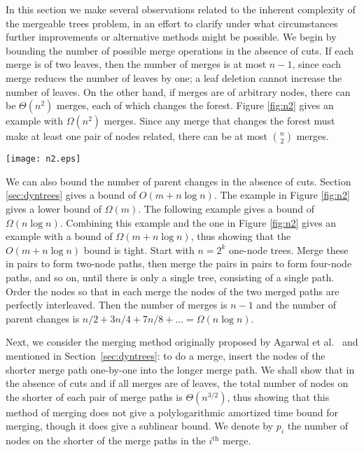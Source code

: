 \documentclass[twoside,leqno,twocolumn]{article}
\begin{document}
In this section we make several observations related to the inherent complexity of the mergeable trees problem, in an effort to clarify under what circumstances further improvements or alternative methods might be possible.  We begin by bounding the number of possible merge operations in the absence of cuts.  If each merge is of two leaves, then the number of merges is at most $n - 1$, since each merge reduces the number of leaves by one; a leaf deletion cannot increase the number of leaves.  On the other hand, if merges are of arbitrary nodes, there can be $\Theta(n^2)$ merges, each of which changes the forest.  Figure \ref{fig:n2} gives an example with $\Omega(n^2)$ merges.  Since any merge that changes the forest must make at least one pair of nodes related, there can be at most $n \choose 2$ merges.

\begin{figure*}
\begin{center}
\resizebox{1\textwidth}{!} {\texttt{[image: n2.eps]}}
\end{center}
\caption{\label{fig:n2} An example with $\Theta(n^2)$ merges. The
sequence of merges consists of $k$ rounds, each with $k$ merges;
the $i^{\mathrm{th}}$ merge of round $j$ merges nodes $k+i$ and $j$. The
number of nodes is $n = 2k+1$. Figure \ref{fig:n2}(a) is the initial tree,
Figure \ref{fig:n2}(b) is the tree after the first round of $k$ merges, and
Figure \ref{fig:n2}(c) is the tree after all $k^2$ merges.}
\end{figure*}

We can also bound the number of parent changes in the absence of cuts.  Section \ref{sec:dyntrees} gives a bound of $O(m + n\log n)$.  The example in Figure \ref{fig:n2} gives a lower bound of $\Omega(m)$.  The following example gives a bound of $\Omega(n \log n)$.  Combining this example and the one in Figure \ref{fig:n2} gives an example with a bound of $\Omega(m + n \log n)$, thus showing that the $O(m + n \log n)$ bound is tight. Start with $n = 2^k$ one-node trees.  Merge these in pairs to form two-node paths, then merge the pairs in pairs to form four-node paths, and so on, until there is only a single tree, consisting of a single path.  Order the nodes so that in each merge the nodes of the two merged paths are perfectly interleaved.  Then the number of merges is $n - 1$ and the number of parent changes is $n/2 +3n/4 + 7n/8 + ... = \Omega(n \log n)$.

Next, we consider the merging method originally proposed by Agarwal et al.~\cite{AEHW06} and mentioned in Section~\ref{sec:dyntrees}: to do a merge, insert the nodes of the shorter merge path one-by-one into the longer merge path.  We shall show that in the absence of cuts and if all merges are of leaves, the total number of nodes on the shorter of each pair of merge paths is $\Theta(n^{3/2})$, thus showing that this method of merging does not give a polylogarithmic amortized time bound for merging, though it does give a sublinear bound.  We denote by $p_i$ the number of nodes on the shorter of the merge paths in the $i^\mathrm{th}$ merge.
\end{document}
